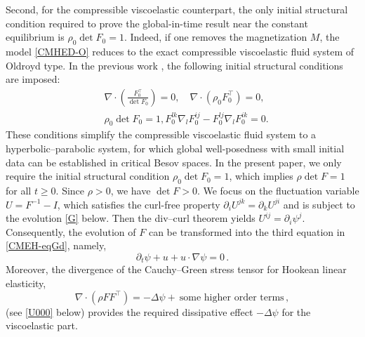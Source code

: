 \documentclass[reqno,11pt]{amsart}
\numberwithin{equation}{section}
\begin{document}
Second, for the compressible viscoelastic counterpart, the only initial structural condition required to prove the global-in-time result near the constant equilibrium is $\rho_0 \det F_0 = 1$. Indeed, if one removes the magnetization $M$, the model \eqref{CMHED-O} reduces to the exact compressible viscoelastic fluid system of Oldroyd type. In the previous work \cite{QZ-ARMA-2010}, the following initial structural conditions are imposed:
\begin{equation*}
  \begin{aligned}
    & \nabla \cdot\left(\frac{F_{0}^{\top}}{\det F_{0}}\right)=0, \quad \nabla \cdot\left(\rho_{0} F_{0}^{\top}\right)=0, \\
    & \rho_{0} \det F_{0}=1, F_{0}^{l k} \nabla_{l} F_{0}^{i j}-F_{0}^{l j} \nabla_{l} F_{0}^{i k}=0.
  \end{aligned}
\end{equation*}
These conditions simplify the compressible viscoelastic fluid system to a hyperbolic–parabolic system, for which global well-posedness with small initial data can be established in critical Besov spaces. In the present paper, we only require the initial structural condition $\rho_{0} \det F_{0}=1$, which implies $\rho \det F=1$ for all $t \geq 0$. Since $\rho > 0$, we have $\det F > 0$. We focus on the fluctuation variable $U = F^{-1} - I$, which satisfies the curl-free property $\partial_{i} U^{j k} = \partial_{k} U^{j i}$ and is subject to the evolution \eqref{G} below. Then the div–curl theorem yields $U^{ij} = \partial_i \psi^j$. Consequently, the evolution of $F$ can be transformed into the third equation in \eqref{CMEH-eqGd}, namely,
$$\partial_{t} \psi+u+u \cdot \nabla \psi = 0 \,.$$
Moreover, the divergence of the Cauchy–Green stress tensor for Hookean linear elasticity,
$$ \nabla \cdot (\rho F F^{\top}) = - \Delta \psi+\ \text{some higher order terms} \,,$$
(see \eqref{U000} below) provides the required dissipative effect $-\Delta \psi$ for the viscoelastic part.
\end{document}
